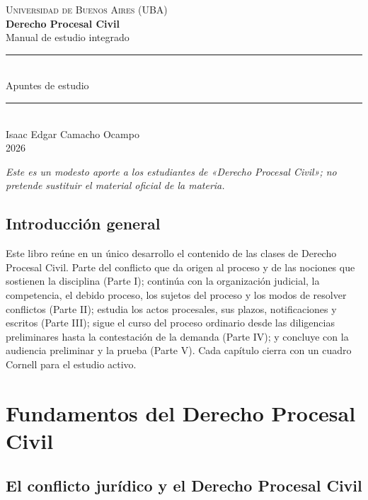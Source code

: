 \documentclass[12pt,oneside]{book}
\newcommand{\universidad}{Universidad de Buenos Aires (UBA)}
\newcommand{\materia}{Derecho Procesal Civil}
\newcommand{\titulo}{Derecho Procesal Civil}
\newcommand{\subtitulo}{Manual de estudio integrado}
\newcommand{\autor}{Isaac Edgar Camacho Ocampo}
\newcommand{\anio}{2026}
\begin{document}
\begin{titlepage}
\thispagestyle{empty}
\begin{center}
\vspace*{1cm}
{\large \textsc{\universidad}}\\[3cm]
{\Huge \textbf{\titulo}}\\[0.8cm]
{\LARGE \subtitulo}\\[1.2cm]
\rule{0.70\textwidth}{0.5pt}\\[0.4cm]
{\large Apuntes de estudio}\\[0.4cm]
\rule{0.70\textwidth}{0.5pt}\\
\vfill
{\large \autor}\\[0.3cm]
{\large \anio}
\end{center}
\vfill
\begin{flushleft}
\textit{Este es un modesto aporte a los estudiantes de «\materia»; no pretende sustituir el material oficial de la materia.}
\end{flushleft}
\end{titlepage}

\frontmatter
\tableofcontents
\mainmatter

\chapter*{Introducción general}

Este libro reúne en un único desarrollo el contenido de las clases de Derecho Procesal Civil. Parte del conflicto que da origen al proceso y de las nociones que sostienen la disciplina (Parte I); continúa con la organización judicial, la competencia, el debido proceso, los sujetos del proceso y los modos de resolver conflictos (Parte II); estudia los actos procesales, sus plazos, notificaciones y escritos (Parte III); sigue el curso del proceso ordinario desde las diligencias preliminares hasta la contestación de la demanda (Parte IV); y concluye con la audiencia preliminar y la prueba (Parte V). Cada capítulo cierra con un cuadro Cornell para el estudio activo.

\part{Fundamentos del Derecho Procesal Civil}

\chapter{El conflicto jurídico y el Derecho Procesal Civil}
\label{cap:conflicto}
\end{document}

